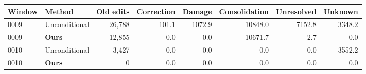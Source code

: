 \begin{tabular}{@{}llrrrrrr@{}}
\toprule
Window & Method & Old edits & Correction & Damage & Consolidation & Unresolved & Unknown \\
\midrule
0009 & Unconditional & 26,788 & 101.1 & 1072.9 & 10848.0 & 7152.8 & 3348.2 \\
0009 & \textbf{Ours} & 12,855 & 0.0 & 0.0 & 10671.7 & 2.7 & 0.0 \\
0010 & Unconditional & 3,427 & 0.0 & 0.0 & 0.0 & 0.0 & 3552.2 \\
0010 & \textbf{Ours} & 0 & 0.0 & 0.0 & 0.0 & 0.0 & 0.0 \\
\bottomrule
\end{tabular}
